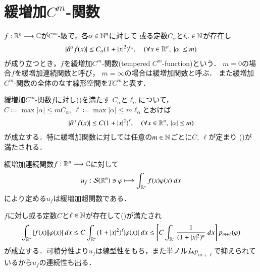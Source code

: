 \section{緩増加$C^m$-関数}
	\begin{screen}
		\begin{dfn}[緩増加$C^m$-関数]
			$f:\mathbb{R}^n \longrightarrow \mathbb{C}$が$C^m$-級で，各$\alpha \in \mathbb{N}^n$に対して
			或る定数$C_\alpha$と$\ell_\alpha \in \mathbb{N}$が存在し
			\begin{align}
				\left| \partial^\alpha f(x) \right| \leq C_\alpha(1+|x|^2)^{\ell_\alpha},
				\quad (\forall x \in \mathbb{R}^n,\ |\alpha| \leq m)
				\label{eq:tempered_c^m_function}
			\end{align}
			が成り立つとき，$f$を緩増加$C^m$-関数(tempered $C^m$-function)という．
			$m=0$の場合$f$を緩増加連続関数と呼び，
			$m=\infty$の場合は緩増加関数と呼ぶ．
			また緩増加$C^m$-関数の全体のなす線形空間を$TC^m$と表す．
		\end{dfn}
	\end{screen}
	
	緩増加$C^m$-関数$f$に対し()を満たす
	$C_\alpha$と$\ell_\alpha$について，
	$C \coloneqq \max{|\alpha| \leq m}{C_\alpha}
	,\ \ell \coloneqq \max{|\alpha| \leq m}{\ell_\alpha}$とおけば
	\begin{align}
		\left| \partial^\alpha f(x) \right| \leq C(1+|x|^2)^\ell,
		\quad (\forall x \in \mathbb{R}^n,\ |\alpha| \leq m)
		\label{eq:tempered_c^m_function_2}
	\end{align}
	が成立する．特に緩増加関数に対しては任意の$m \in \mathbb{N}$ごとに$C,\ \ell$が定まり
	()が満たされる．
	
	\begin{screen}
		\begin{thm}[緩増加連続関数により定まる緩増加超関数]
		\label{thm:tempered_continuous_functions_and_tempered_distributions}
			緩増加連続関数$f:\mathbb{R}^n \longrightarrow \mathbb{C}$に対して
			\begin{align}
				u_f: \mathcal{S}(\mathbb{R}^n) \ni \varphi \longmapsto
				\int_{\mathbb{R}^n} f(x) \varphi(x)\ dx
			\end{align}
			により定める$u_f$は緩増加超関数である．
		\end{thm}
	\end{screen}
	
	\begin{prf}
		$f$に対し或る定数$C$と$\ell \in \mathbb{N}$が存在して()が満たされ
		\begin{align}
			\int_{\mathbb{R}^n} |f(x)| |\varphi(x)|\ dx
			\leq C \int_{\mathbb{R}^n} (1+|x|^2)^\ell |\varphi(x)|\ dx
			\leq \left[ C \int_{\mathbb{R}^n} \frac{1}{(1+|x|^2)^n}\ dx \right] p_{m+\ell}(\varphi) 
		\end{align}
		が成立する．可積分性より$u_f$は線型性をもち，また半ノルム$p_{m+\ell}$で抑えられているから$u_f$の連続性も出る．
		\QED
	\end{prf}